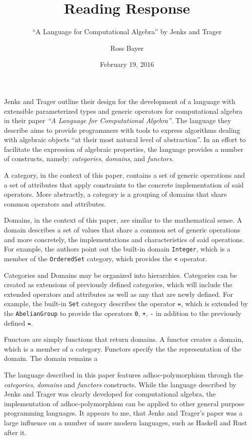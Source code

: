 \documentclass[a4paper,fleqn,notitlepage]{scrartcl}
\title{Reading Response}
\subtitle{``A Language for Computational Algebra'' by Jenks and Trager}
\author{Ross Bayer}
\date{February 19, 2016}
\begin{document}
\maketitle


Jenks and Trager outline their design for the development of a language
with extensible parameterized types and generic operators for computational
algebra in their paper \textit{``A Language for Computational Algebra''}. The
language they describe aims to provide programmers with tools to express
algorithms dealing with algebraic objects ``at their most natural level of
abstraction''. In an effort to facilitate the expression of algebraic properties,
the language provides a number of constructs, namely: \textit{categories},
\textit{domains}, and \textit{functors}.

A category, in the context of this paper, contains a set of generic operations
and a set of attributes that apply constraints to the concrete implementation
of said operators. More abstractly, a category is a grouping of domains that
share common operators and attributes.

Domains, in the context of this paper, are similar to the mathematical sense. A
domain describes a set of values that share a common set of generic operations
and more concretely, the implementations and characteristics of said operations.
For example, the authors point out the built-in domain \verb|Integer|, which is a 
member of the \verb|OrderedSet| category, which provides the \verb|<| operator.

Categories and Domains may be organized into hierarchies. Categories can be
created as extensions of previously defined categories, which will include
the extended operators and attributes as well as any that are newly defined.
For example, the built-in \verb|Set| category describes the operator \verb|=|, 
which is extended by the \verb|AbelianGroup| to provide the operators \verb|0|,
\verb|+|, \verb|-| in addition to the previously defined \verb|=|.

Functors are simply functions that return domains. A functor creates a domain,
which is a member of a category. Functors specify the the representation of the
domain. The domain remains a 

The language described in this paper features adhoc-polymorphism through the
\textit{categories}, \textit{domains} and \textit{functors} constructs. While
the language described by Jenks and Trager was clearly developed for computational
algebra, the implementation of adhoc-polymorphism can be applied to other general
purpose programming languages. It appears to me, that Jenks and Trager's paper
was a large influence on a number of more modern languages, such as Haskell and
Rust after it.
\end{document}
